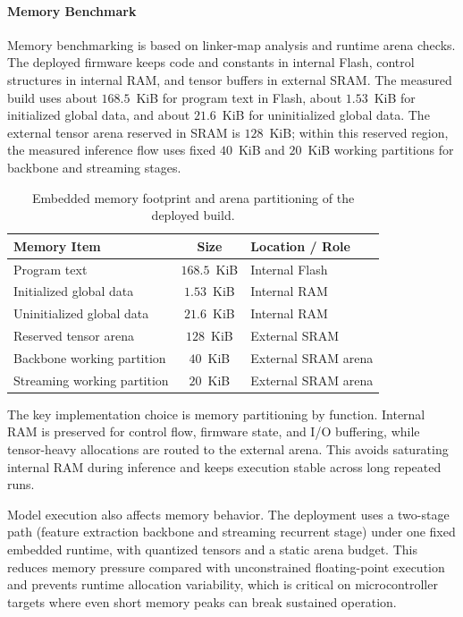 \documentclass[a4paper,singleside,12pt]{report} %
\begin{document}
	\paragraph{Memory Benchmark}
	Memory benchmarking is based on linker-map analysis and runtime arena checks. The deployed firmware keeps code and constants in internal Flash, control structures in internal RAM, and tensor buffers in external SRAM. The measured build uses about \(168.5\)~KiB for program text in Flash, about \(1.53\)~KiB for initialized global data, and about \(21.6\)~KiB for uninitialized global data. The external tensor arena reserved in SRAM is \(128\)~KiB; within this reserved region, the measured inference flow uses fixed \(40\)~KiB and \(20\)~KiB working partitions for backbone and streaming stages.

	\begin{table}[H]
		\centering
		\scriptsize
		\renewcommand{\arraystretch}{1.15}
		\setlength{\tabcolsep}{6pt}
		\caption{Embedded memory footprint and arena partitioning of the deployed build.}
		\label{tab:memory_footprint_summary}
		\begin{tabular}{|l|c|l|}
			\hline
			Memory Item & Size & Location / Role \\
			\hline
			Program text & \(168.5\)~KiB & Internal Flash \\
			\hline
			Initialized global data & \(1.53\)~KiB & Internal RAM \\
			\hline
			Uninitialized global data & \(21.6\)~KiB & Internal RAM \\
			\hline
			Reserved tensor arena & \(128\)~KiB & External SRAM \\
			\hline
			Backbone working partition & \(40\)~KiB & External SRAM arena \\
			\hline
			Streaming working partition & \(20\)~KiB & External SRAM arena \\
			\hline
		\end{tabular}
	\end{table}

	The key implementation choice is memory partitioning by function. Internal RAM is preserved for control flow, firmware state, and I/O buffering, while tensor-heavy allocations are routed to the external arena. This avoids saturating internal RAM during inference and keeps execution stable across long repeated runs.

	Model execution also affects memory behavior. The deployment uses a two-stage path (feature extraction backbone and streaming recurrent stage) under one fixed embedded runtime, with quantized tensors and a static arena budget. This reduces memory pressure compared with unconstrained floating-point execution and prevents runtime allocation variability, which is critical on microcontroller targets where even short memory peaks can break sustained operation.
\end{document}
